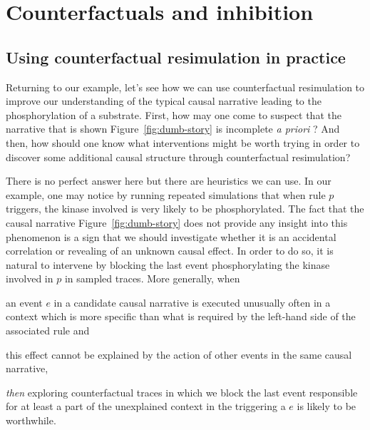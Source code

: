 
\section{Counterfactuals and inhibition}\label{sec:inhibition}

\subsection{Using counterfactual resimulation in practice}
\label{sec:practice}

Returning to our example, let's see how we can use counterfactual
resimulation to improve our understanding of the typical causal
narrative leading to the phosphorylation of a substrate. First, how
may one come to suspect that the narrative that is shown
Figure~\ref{fig:dumb-story} is incomplete \textit{a priori} ? And
then, how should one know what interventions might be worth trying in
order to discover some additional causal structure through
counterfactual resimulation?


% 
There is no perfect answer here but there are heuristics we can
use. In our example, one may notice by running repeated simulations
that when rule $p$ triggers, the kinase involved is very likely to be
phosphorylated. The fact that the causal narrative
Figure~\ref{fig:dumb-story} does not provide any insight into this
phenomenon is a sign that we should investigate whether it is
an accidental correlation or revealing of an unknown causal effect. In
order to do so, it is natural to intervene by blocking the last event
phosphorylating the kinase involved in $p$ in sampled traces. More
generally, when
\begin{inparaenum}[(i)]
\item an event $e$ in a candidate causal narrative is executed
  unusually often in a context which is more specific than what is
  required by the left-hand side of the associated rule and
\item this effect cannot be explained by the action of other events in
  the same causal narrative,
\end{inparaenum}
\textit{then} exploring counterfactual traces in which we block the last event
responsible for at least a part of the unexplained context in the
triggering a $e$ is likely to be worthwhile.

